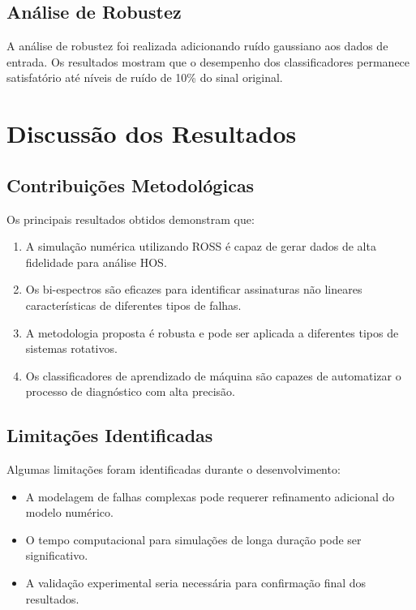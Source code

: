 \subsection{Análise de Robustez}

A análise de robustez foi realizada adicionando ruído gaussiano aos dados de entrada. Os resultados mostram que o desempenho dos classificadores permanece satisfatório até níveis de ruído de 10\% do sinal original.

\section{Discussão dos Resultados}

\subsection{Contribuições Metodológicas}

Os principais resultados obtidos demonstram que:

\begin{enumerate}
    \item A simulação numérica utilizando ROSS é capaz de gerar dados de alta fidelidade para análise HOS.
    \item Os bi-espectros são eficazes para identificar assinaturas não lineares características de diferentes tipos de falhas.
    \item A metodologia proposta é robusta e pode ser aplicada a diferentes tipos de sistemas rotativos.
    \item Os classificadores de aprendizado de máquina são capazes de automatizar o processo de diagnóstico com alta precisão.
\end{enumerate}

\subsection{Limitações Identificadas}

Algumas limitações foram identificadas durante o desenvolvimento:

\begin{itemize}
    \item A modelagem de falhas complexas pode requerer refinamento adicional do modelo numérico.
    \item O tempo computacional para simulações de longa duração pode ser significativo.
    \item A validação experimental seria necessária para confirmação final dos resultados.
\end{itemize}

